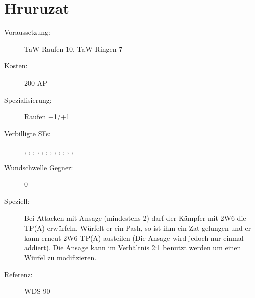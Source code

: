 \section{Hruruzat}
\label{uSpez.hruruzat}
\begin{description}
    \item[Voraussetzung:]
        TaW Raufen 10, TaW Ringen 7
    \item[Kosten:]
        200 AP
    \item[Spezialisierung:]
        Raufen +1/+1
    \item[Verbilligte SFs:]
        , , , , , , , , , , , , 
    \item[Wundschwelle Gegner:]
        0
    \item[Speziell:]
        Bei Attacken mit Ansage (mindestens 2) darf der Kämpfer mit 2W6 die TP(A) erwürfeln.
        Würfelt er ein Pash, so ist ihm ein Zat gelungen und er kann erneut 2W6 TP(A) austeilen (Die Ansage wird jedoch nur einmal addiert).
        Die Ansage kann im Verhältnis 2:1 benutzt werden um einen Würfel zu modifizieren.
    \item [Referenz:]
        WDS 90
\end{description}
